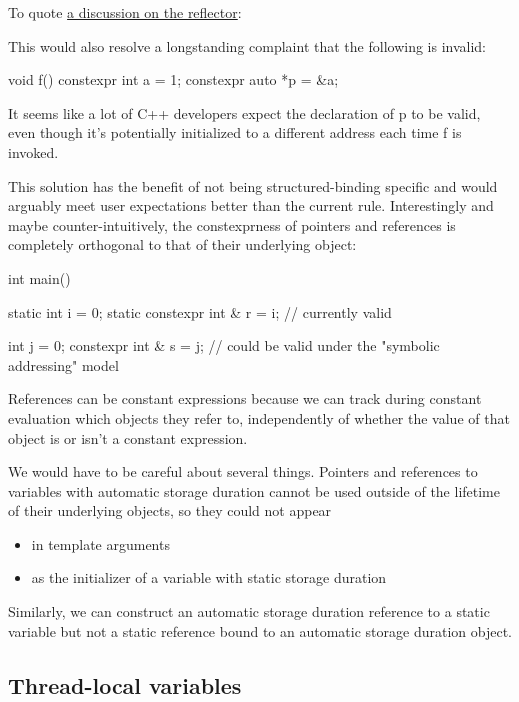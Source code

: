 \documentclass{wg21}
\begin{document}
To quote \href{https://lists.isocpp.org/core/2023/04/14163.php}{a discussion on the reflector}:

\begin{quoteblock}
This would also resolve a longstanding complaint that the following is invalid:
\begin{colorblock}
void f() {
    constexpr int a = 1;
    constexpr auto *p = &a;
}
\end{colorblock}

It seems like a lot of C++ developers expect the declaration of p to be valid, even though it's potentially initialized to a different address each time f is invoked.
\end{quoteblock}

This solution has the benefit of not being structured-binding specific and would arguably meet user expectations better than the current rule.
Interestingly and maybe counter-intuitively, the constexprness of pointers and references is completely orthogonal to that of their underlying object:

\begin{colorblock}
int main() {
    static int i = 0;
    static constexpr int & r = i; // currently valid

    int j = 0;
    constexpr int & s = j; // could be valid under the "symbolic addressing" model
}
\end{colorblock}

References can be constant expressions because we can track during constant evaluation which objects they refer to, independently of whether the value of that object is or isn't a constant expression.

We would have to be careful about several things.
Pointers and references to variables with automatic storage duration cannot be used outside of the lifetime of their underlying objects, so they could not appear
\begin{itemize}
  \item in template arguments
  \item as the initializer of a variable with static storage duration
\end{itemize}

Similarly, we can construct an automatic storage duration  reference to a static variable but not a static  reference bound to an automatic storage duration object.

\subsection{Thread-local variables}
\end{document}
